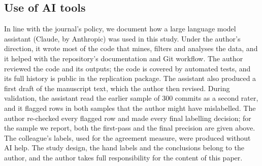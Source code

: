 \subsection{Use of AI tools}\label{sec:ai}

In line with the journal's policy, we document how a large language model assistant (Claude, by Anthropic) was used in this study. Under the author's direction, it wrote most of the code that mines, filters and analyses the data, and it helped with the repository's documentation and Git workflow. The author reviewed the code and its outputs; the code is covered by automated tests, and its full history is public in the replication package. The assistant also produced a first draft of the manuscript text, which the author then revised. During validation, the assistant read the earlier sample of 300 commits as a second rater, and it flagged rows in both samples that the author might have mislabelled. The author re-checked every flagged row and made every final labelling decision; for the sample we report, both the first-pass and the final precision are given above. The colleague's labels, used for the agreement measure, were produced without AI help. The study design, the hand labels and the conclusions belong to the author, and the author takes full responsibility for the content of this paper.
